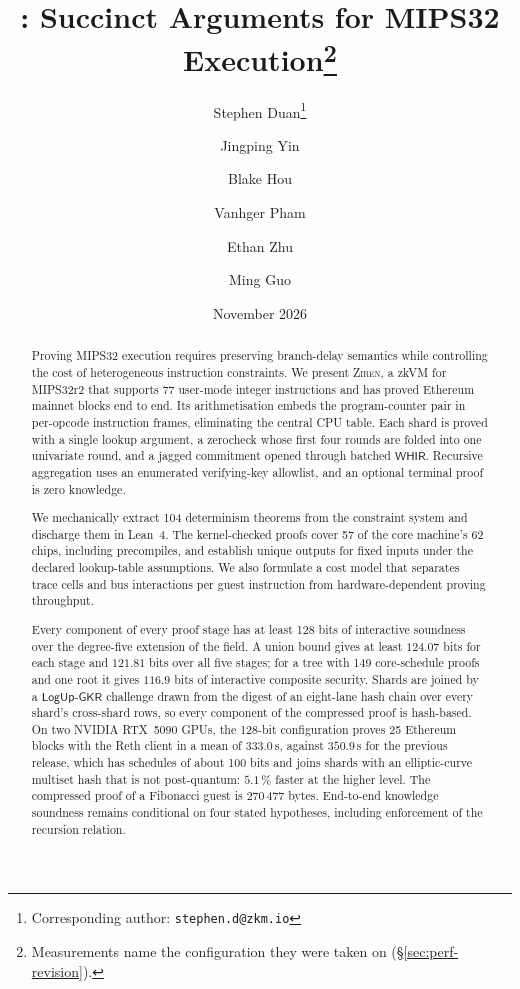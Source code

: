 \documentclass[10pt,letterpaper]{article}
\title{\Zirenver{}: Succinct Arguments for MIPS32 Execution\thanks{Measurements name the configuration they were taken on (\S\ref{sec:perf-revision}).}}
\author[1, 2]{Stephen Duan\thanks{Corresponding author: \texttt{stephen.d@zkm.io}}}
\author[1]{Jingping Yin}
\author[1]{Blake Hou}
\author[1]{Vanhger Pham}
\author[2]{Ethan Zhu}
\author[1]{Ming Guo}
\affil[1]{ZKM Team}
\affil[2]{GOAT Network}
\date{November 2026}
\theoremstyle{definition}
\theoremstyle{remark}
\theoremstyle{plain}
\newcommand{\LogUp}{\ensuremath{\mathsf{LogUp\text{-}GKR}}}
\newcommand{\WHIR}{\ensuremath{\mathsf{WHIR}}}
\newcommand{\zkVM}{zkVM}
\newcommand{\Ziren}{\textsc{Ziren}}
\newcommand{\Lean}{Lean~4}
\newcommand{\ndettotal}{104}
\begin{document}
\maketitle

\begin{abstract}
Proving MIPS32 execution requires preserving branch-delay semantics while controlling the cost of heterogeneous instruction constraints. We present \Ziren{}, a \zkVM{} for MIPS32r2 that supports 77 user-mode integer instructions and has proved Ethereum mainnet blocks end to end. Its arithmetisation embeds the program-counter pair in per-opcode instruction frames, eliminating the central CPU table. Each shard is proved with a single lookup argument, a zerocheck whose first four rounds are folded into one univariate round, and a jagged commitment opened through batched \WHIR{}. Recursive aggregation uses an enumerated verifying-key allowlist, and an optional terminal proof is zero knowledge.

We mechanically extract \ndettotal{} determinism theorems from the constraint system and discharge them in \Lean{}. The kernel-checked proofs cover 57 of the core machine's 62 chips, including precompiles, and establish unique outputs for fixed inputs under the declared lookup-table assumptions. We also formulate a cost model that separates trace cells and bus interactions per guest instruction from hardware-dependent proving throughput.

Every component of every proof stage has at least 128 bits of interactive soundness over the degree-five extension of the field. A union bound gives at least $124.07$ bits for each stage and $121.81$ bits over all five stages; for a tree with 149 core-schedule proofs and one root it gives $116.9$ bits of interactive composite security. Shards are joined by a \LogUp{} challenge drawn from the digest of an eight-lane hash chain over every shard's cross-shard rows, so every component of the compressed proof is hash-based. On two NVIDIA RTX~5090 GPUs, the 128-bit configuration proves 25 Ethereum blocks with the Reth client in a mean of $333.0$\,s, against $350.9$\,s for the previous release, which has schedules of about 100 bits and joins shards with an elliptic-curve multiset hash that is not post-quantum: $5.1\,\%$ faster at the higher level. The compressed proof of a Fibonacci guest is 270\,477 bytes. End-to-end knowledge soundness remains conditional on four stated hypotheses, including enforcement of the recursion relation.
\end{abstract}
\end{document}
